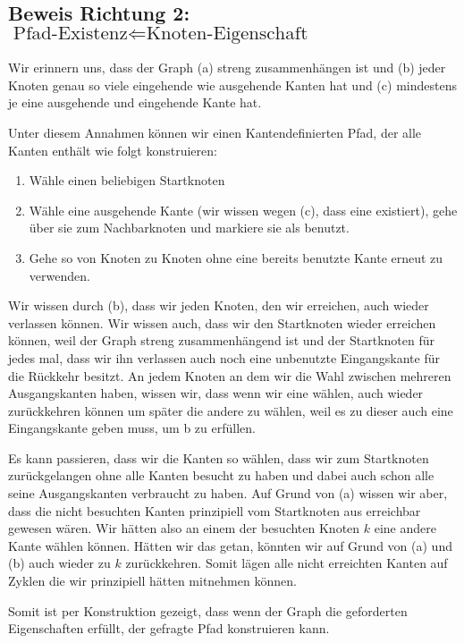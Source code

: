 \documentclass[parskip=half,a4paper]{scrartcl}
\begin{document}
\subsection*{Beweis Richtung 2: $\text{Pfad-Existenz} \Leftarrow \text{Knoten-Eigenschaft}$}

Wir erinnern uns, dass der Graph (a) streng zusammenhängen ist und (b) jeder Knoten genau so viele eingehende wie ausgehende Kanten hat und (c) mindestens je eine ausgehende und eingehende Kante hat.

Unter diesem Annahmen können wir einen Kantendefinierten Pfad, der alle Kanten enthält wie folgt konstruieren:

\begin{enumerate}
    \item Wähle einen beliebigen Startknoten
    \item Wähle eine ausgehende Kante (wir wissen wegen (c), dass eine existiert), gehe über sie zum Nachbarknoten und markiere sie als benutzt.
    \item Gehe so von Knoten zu Knoten ohne eine bereits benutzte Kante erneut zu verwenden.
\end{enumerate}

Wir wissen durch (b), dass wir jeden Knoten, den wir erreichen, auch wieder verlassen können. Wir wissen auch, dass wir den Startknoten wieder erreichen können, weil der Graph streng zusammenhängend ist und der Startknoten für jedes mal, dass wir ihn verlassen auch noch eine unbenutzte Eingangskante für die Rückkehr besitzt. An jedem Knoten an dem wir die Wahl zwischen mehreren Ausgangskanten haben, wissen wir, dass wenn wir eine wählen, auch wieder zurückkehren können um später die andere zu wählen, weil es zu dieser auch eine Eingangskante geben muss, um b zu erfüllen.

Es kann passieren, dass wir die Kanten so wählen, dass wir zum Startknoten zurückgelangen ohne alle Kanten besucht zu haben und dabei auch schon alle seine Ausgangskanten verbraucht zu haben. Auf Grund von (a) wissen wir aber, dass die nicht besuchten Kanten prinzipiell vom Startknoten aus erreichbar gewesen wären. Wir hätten also an einem der besuchten Knoten $k$ eine andere Kante wählen können. Hätten wir das getan, könnten wir auf Grund von (a) und (b) auch wieder zu $k$ zurückkehren. Somit lägen alle nicht erreichten Kanten auf Zyklen die wir prinzipiell hätten mitnehmen können.

Somit ist per Konstruktion gezeigt, dass wenn der Graph die geforderten Eigenschaften erfüllt, der gefragte Pfad konstruieren kann.
\end{document}
